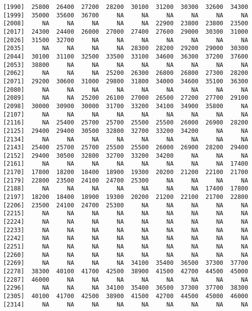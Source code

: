 \documentclass[]{article}
\begin{document}
\begin{verbatim}
 [1990]  25800  26400  27200  28200  30100  31200  30300  32600  34300
 [1999]  35000  35600  36700     NA     NA     NA     NA     NA     NA
 [2008]     NA     NA     NA     NA     NA  22900  23800  23800  23500
 [2017]  24300  24400  26000  27000  27400  27600  29000  30300  31000
 [2026]  31500  32700     NA     NA     NA     NA     NA     NA     NA
 [2035]     NA     NA     NA     NA  28300  28200  29200  29000  30300
 [2044]  30100  31100  32500  33500  33100  34600  36300  37200  37600
 [2053]  38800     NA     NA     NA     NA     NA     NA     NA     NA
 [2062]     NA     NA     NA  25200  26300  26800  26800  27300  28200
 [2071]  29200  30600  31000  29800  31800  34000  34600  35100  36300
 [2080]     NA     NA     NA     NA     NA     NA     NA     NA     NA
 [2089]     NA     NA  25200  26100  27000  26500  27200  27700  29100
 [2098]  30000  30900  30000  31700  33200  34100  34900  35800     NA
 [2107]     NA     NA     NA     NA     NA     NA     NA     NA     NA
 [2116]     NA  25400  25700  25700  25500  25500  26000  26900  28200
 [2125]  29400  29400  30500  32800  32700  33200  34200     NA     NA
 [2134]     NA     NA     NA     NA     NA     NA     NA     NA     NA
 [2143]  25400  25700  25700  25500  25500  26000  26900  28200  29400
 [2152]  29400  30500  32800  32700  33200  34200     NA     NA     NA
 [2161]     NA     NA     NA     NA     NA     NA     NA     NA  17400
 [2170]  17800  18200  18400  18900  19300  20200  21200  22100  21700
 [2179]  22800  23500  24100  24700  25300     NA     NA     NA     NA
 [2188]     NA     NA     NA     NA     NA     NA     NA  17400  17800
 [2197]  18200  18400  18900  19300  20200  21200  22100  21700  22800
 [2206]  23500  24100  24700  25300     NA     NA     NA     NA     NA
 [2215]     NA     NA     NA     NA     NA     NA     NA     NA     NA
 [2224]     NA     NA     NA     NA     NA     NA     NA     NA     NA
 [2233]     NA     NA     NA     NA     NA     NA     NA     NA     NA
 [2242]     NA     NA     NA     NA     NA     NA     NA     NA     NA
 [2251]     NA     NA     NA     NA     NA     NA     NA     NA     NA
 [2260]     NA     NA     NA     NA     NA     NA     NA     NA     NA
 [2269]     NA     NA     NA     NA  34100  35400  36500  37300  37700
 [2278]  38300  40100  41700  42500  38900  41500  42700  44500  45000
 [2287]  46000     NA     NA     NA     NA     NA     NA     NA     NA
 [2296]     NA     NA     NA  34100  35400  36500  37300  37700  38300
 [2305]  40100  41700  42500  38900  41500  42700  44500  45000  46000
 [2314]     NA     NA     NA     NA     NA     NA     NA     NA     NA

\end{verbatim}
\end{document}
